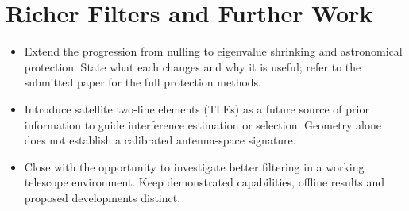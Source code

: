 \documentclass[11pt,twoside]{article}
\begin{document}
\section{Richer Filters and Further Work}
\begin{itemize}
\item Extend the progression from nulling to eigenvalue shrinking and
astronomical protection. State what each changes and why it is useful;
refer to the submitted paper for the full protection methods.
\item Introduce satellite two-line elements (TLEs) as a future source of
prior information to guide interference estimation or selection. Geometry
alone does not establish a calibrated antenna-space signature.
\item Close with the opportunity to investigate better filtering in a
working telescope environment. Keep demonstrated capabilities, offline
results and proposed developments distinct.
\end{itemize}

% 
\end{document}
